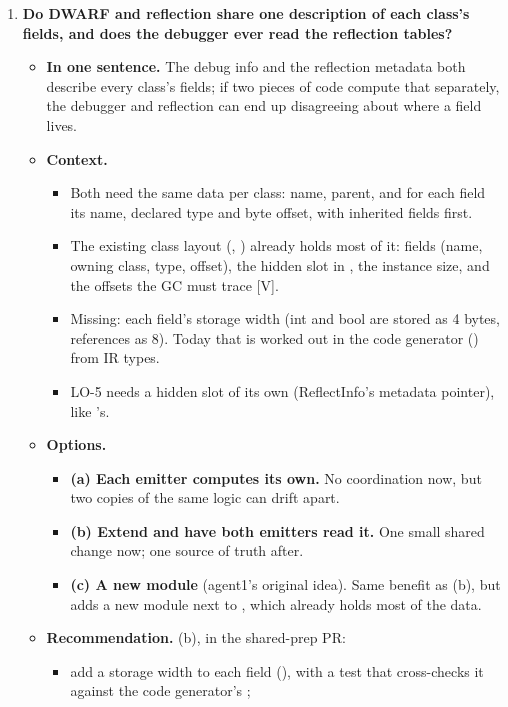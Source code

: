 \documentclass[10pt]{article}
\newcommand{\mV}{\textsf{\scriptsize[V]}}
\newcommand{\field}[1]{\textbf{#1}\enspace}
\newcommand{\decitem}[1]{\needspace{6\baselineskip}\setcounter{enumi}{\numexpr#1-1\relax}\item}
\begin{document}
\begin{enumerate}[label=\textbf{\arabic*.},ref=\arabic*,leftmargin=1.8em,itemsep=0.8em]
\decitem{6}\label{dec:classmodel}\textbf{Do DWARF and reflection share one description of each class's fields, and does the debugger ever read the reflection tables?}
\begin{itemize}
\item[] \field{In one sentence.} The debug info and the reflection metadata both describe every class's fields; if two pieces of code compute that separately, the debugger and reflection can end up disagreeing about where a field lives.
\item[] \field{Context.}
\begin{itemize}
\item Both need the same data per class: name, parent, and for each field its name, declared type and byte offset, with inherited fields first.
\item The existing class layout (, ) already holds most of it: fields (name, owning class, type, offset), the hidden slot in , the instance size, and the offsets the GC must trace \mV.
\item Missing: each field's storage width (int and bool are stored as 4 bytes, references as 8). Today that is worked out in the code generator () from IR types.
\item LO-5 needs a hidden slot of its own (ReflectInfo's metadata pointer), like 's.
\end{itemize}
\item[] \field{Options.}
\begin{itemize}
\item \textbf{(a) Each emitter computes its own.} No coordination now, but two copies of the same logic can drift apart.
\item \textbf{(b) Extend  and have both emitters read it.} One small shared change now; one source of truth after.
\item \textbf{(c) A new  module} (agent1's original idea). Same benefit as (b), but adds a new module next to , which already holds most of the data.
\end{itemize}
\item[] \field{Recommendation.} (b), in the shared-prep PR:
\begin{itemize}
\item add a storage width to each field (), with a test that cross-checks it against the code generator's ;

\end{itemize}
\end{itemize}
\end{enumerate}
\end{document}
